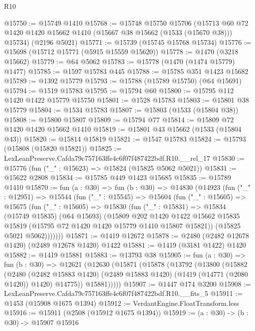 \begin{lexlean}{R10}
\begin{coremodule}
@15750 := @15749 @1410
@15768 := @15748
    @15750
    @15706
    (@15713 @60 @72 @1420 @1420 @15662 @1410 (@15667 @38 @15662 (@1533 (@15670 @38))) @15734)
    (@2196 @5021)
@15771 := @15739 (@15745 @15768 @15734)
@15776 := @15698 (@15712 @15771 (@5915 @15559 @15620))
@15778 := @1470 (@3218 @15662)
@15779 := @64 @5062
@15783 := @15778 (@1470 (@1474 @15779) @1477)
@15785 := @1597 @15783 @445
@15788 := @15785 @351 @1423 @15682
@15789 := @1392 @15779
@15793 := @15788 (@15789 @15750) (@64 @15691)
@15794 := @1519 @15783
@15795 := @15794 @60
@15800 := @15795 @112 @1420 @1422 @15779 @15750
@15801 := @1528 @15783
@15803 := @15801 @38 @15779
@15804 := @1534 @15783
@15807 := @15803 (@1533 (@15804 @38))
@15808 := @15800 @15807
@15809 := @15794 @77
@15814 := @15809 @72 @1420 @1420 @15662 @1410
@15819 := @15801 @43 @15662 (@1533 (@15804 @43))
@15820 := @15814 @15819
@15821 := @1547 @15783
@15824 := @15793 (@15808 (@15820 @15821))
@15825 := LexLeanPreserve.Cafda79c757163ffe4c6f07f487422bdf.R10.__rel_17
@15830 := @15776 (fun ("_" : @15623) => @15824 (@15825 @5062 @5021))
@15831 := @15622 @2808
@15834 := @15785 @449 @1423 @15685
@15835 := @15789 @1410
@15870 := fun (a : @30) =>
  fun (b : @30) =>
  @14830
    (@14923
      (fun ("_" : @12951) =>
      @15544
        (fun ("_" : @15545) =>
        @15604
          (fun ("_" : @15605) =>
          @15675
            (fun ("_" : @15605) =>
            @15830
              (fun ("_" : @15831) =>
              @15834
                (@15749 @15835)
                (@64 @15693)
                (@15809
                  @202
                  @1420
                  @1422
                  @15662
                  @15835
                  @15819
                  (@15795 @72 @1420 @1420 @15779 @1410 @15807 @15821))
                (@15825 @5021 @5062)))))))
@15871 := @1419 @12672
@15878 := @2480 (@2482 @12678 @1420) (@2489 @12678 @1420) @1422
@15881 := @1419 (@3181 @1422) @1420
@15882 := @1419 @15881
@15883 := @13793 @38
@15905 := fun (a : @30) =>
  fun (b : @30) =>
  @12621
    (@12630
      (@15871
        (@15878
          (@13792
            (@13800
              (@15882
                (@2480
                  (@2482 @15883 @1420)
                  (@2489 @15883 @1420)
                  (@1419 (@14771 (@2080 @1420)) @1420)
                  @14775))
              @15881)))))
@15907 := @1447 @174 @3200
@15908 := LexLeanPreserve.Cafda79c757163ffe4c6f07f487422bdf.R10.__fits_5
@15911 := @1453 (@15908 @1675 @1394)
@15912 := VerdantEngine.FloatTransform.less
@15916 := @15911 (@2508 (@15912 @1675 @1394))
@15919 := (a : @30) -> (b : @30) -> @15907 @15916

\end{coremodule}
\end{lexlean}
